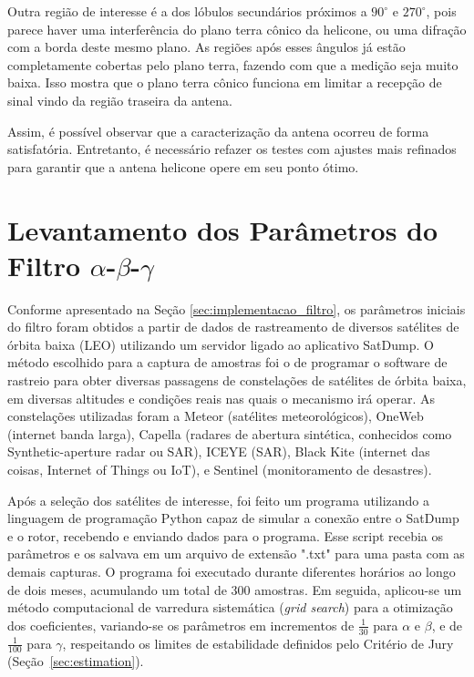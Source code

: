Outra região de interesse é a dos lóbulos secundários próximos a $90^{\circ}$ e $270^{\circ}$, pois parece haver uma interferência do plano terra cônico da helicone, ou uma difração com a borda deste mesmo plano.
As regiões após esses ângulos já estão completamente cobertas pelo plano terra, fazendo com que a medição seja muito baixa.
Isso mostra que o plano terra cônico funciona em limitar a recepção de sinal vindo da região traseira da antena.

Assim, é possível observar que a caracterização da antena ocorreu de forma satisfatória. Entretanto, é necessário refazer os testes com ajustes mais refinados para garantir que a antena helicone opere em seu ponto ótimo.

\section{Levantamento dos Parâmetros do Filtro $\alpha$-$\beta$-$\gamma$}

Conforme apresentado na Seção \ref{sec:implementacao_filtro}, os parâmetros iniciais do filtro foram obtidos a partir de dados de rastreamento de diversos satélites de órbita baixa (LEO) utilizando um servidor ligado ao aplicativo SatDump.
O método escolhido para a captura de amostras foi o de programar o software de rastreio para obter diversas passagens de constelações de satélites de órbita baixa, em diversas altitudes e condições reais nas quais o mecanismo irá operar.
As constelações utilizadas foram a Meteor (satélites meteorológicos), OneWeb (internet banda larga), Capella (radares de abertura sintética, conhecidos como Synthetic-aperture radar ou SAR), ICEYE (SAR), Black Kite (internet das coisas, Internet of Things ou IoT), e Sentinel (monitoramento de desastres).

Após a seleção dos satélites de interesse, foi feito um programa utilizando a linguagem de programação Python capaz de simular a conexão entre o SatDump e o rotor, recebendo e enviando dados para o programa.
Esse script recebia os parâmetros e os salvava em um arquivo de extensão ".txt" para uma pasta com as demais capturas. O programa foi executado durante diferentes horários ao longo de dois meses, acumulando um total de 300 amostras.
Em seguida, aplicou-se um método computacional de varredura sistemática (\textit{grid search}) para a otimização dos coeficientes, variando-se os parâmetros em incrementos de $\frac{1}{30}$ para $\alpha$ e $\beta$, e de $\frac{1}{100}$ para $\gamma$, respeitando os limites de estabilidade definidos pelo Critério de Jury (Seção~\ref{sec:estimation}).

